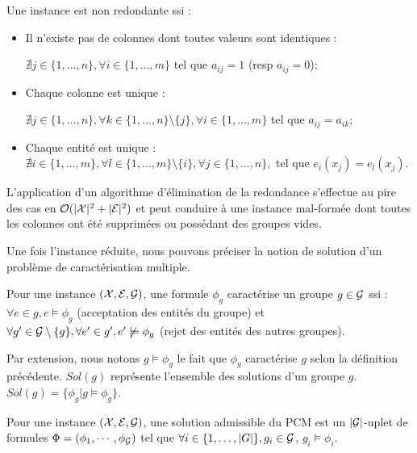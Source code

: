 \begin{definition}
Une instance est non redondante ssi :
\begin{itemize}
\item Il n'existe pas de colonnes dont toutes valeurs sont identiques :

$\nexists j \in \{1,\ldots, n \},\forall i \in \{1, \ldots, m \} $ tel que $a_{ij}=1$ (resp $a_{ij}=0$);
\item Chaque colonne est unique :

$\nexists j \in \{1, \ldots, n \},\forall k \in \{1, \ldots, n \} \setminus \{j\}, \forall i \in \{1, \ldots, m \} $ tel que $a_{ij}=a_{ik}$;
\item Chaque entité est unique : \\$ \nexists i \in \{1, \ldots, m \},
\forall l \in \{1, \ldots, m \} \setminus \{i\},\forall j \in \{1, \ldots, n \},$ tel que $e_i(x_j)=e_l(x_j)$.
\end{itemize}
\end{definition}

L'application d'un algorithme d'élimination de la redondance s'effectue au pire des cas en ${\mathcal O}({|\cal X}|^2+|{\cal E}|^2)$ et peut conduire à une instance mal-formée dont toutes les colonnes ont été supprimées ou possédant des groupes vides.

Une fois l'instance réduite, nous pouvons préciser la notion de solution d'un problème de caractérisation multiple.

\begin{definition}
Pour une instance $({\cal X}, {\cal E}, {\cal G})$, une formule $\phi_g$
caractérise un groupe $g\in {\cal G}$ ssi :
$\forall e \in g, e \models \phi_g$ (acceptation des entités du groupe) et
$\forall g' \in {\cal G} \setminus \{g\},\forall e' \in g',  e' \not \models
\phi_g$ (rejet des entités des autres groupes).
\end{definition}

Par extension, nous notons $g \models \phi_g$ le fait que $\phi_g$ caractérise $g$ selon la définition précédente. $Sol(g)$ représente l'ensemble des solutions d'un groupe $g$. $Sol(g)=\{\phi_g|g \models \phi_g\}$.

\begin{definition}
Pour une instance $({\cal X}, {\cal E}, {\cal G})$, une solution
admissible du PCM  est un $|{\cal G}|$-uplet de formules
$\Phi=(\phi_1,\cdots,\phi_{{\cal G}})$ tel que  $\forall i\in \{1,\ldots,|G|\}, g_i \in
{\cal G}$, $g_i \models \phi_i$.
\end{definition}

